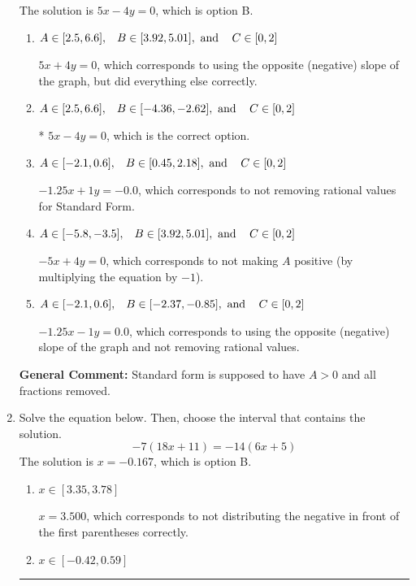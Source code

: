 \documentclass{extbook}[14pt]
\newcommand{\litem}[1]{\item #1

\rule{\textwidth}{0.4pt}}
\begin{document}
\begin{enumerate}
{The solution is \( 5x - 4y = 0 \), which is option B.\begin{enumerate}[label=\Alph*.]
\item \( A \in [2.5, 6.6], \hspace{3mm} B \in [3.92, 5.01], \text{ and } \hspace{3mm} C \in [0, 2] \)

 $5x + 4y = 0$, which corresponds to using the opposite (negative) slope of the graph, but did everything else correctly.
\item \( A \in [2.5, 6.6], \hspace{3mm} B \in [-4.36, -2.62], \text{ and } \hspace{3mm} C \in [0, 2] \)

* $5x - 4y = 0$, which is the correct option.
\item \( A \in [-2.1, 0.6], \hspace{3mm} B \in [0.45, 2.18], \text{ and } \hspace{3mm} C \in [0, 2] \)

 $-1.25x + 1y = -0.0$, which corresponds to not removing rational values for Standard Form.
\item \( A \in [-5.8, -3.5], \hspace{3mm} B \in [3.92, 5.01], \text{ and } \hspace{3mm} C \in [0, 2] \)

 $-5x + 4y = 0$, which corresponds to not making $A$ positive (by multiplying the equation by $-1$).
\item \( A \in [-2.1, 0.6], \hspace{3mm} B \in [-2.37, -0.85], \text{ and } \hspace{3mm} C \in [0, 2] \)

 $-1.25x - 1y = 0.0$, which corresponds to using the opposite (negative) slope of the graph and not removing rational values.
\end{enumerate}

\textbf{General Comment:} Standard form is supposed to have $A > 0$ and all fractions removed.
}
\litem{
Solve the equation below. Then, choose the interval that contains the solution.
\[ -7(18x + 11) = -14(6x + 5) \]The solution is \( x = -0.167 \), which is option B.\begin{enumerate}[label=\Alph*.]
\item \( x \in [3.35, 3.78] \)

$x = 3.500$, which corresponds to not distributing the negative in front of the first parentheses correctly.
\item \( x \in [-0.42, 0.59] \)


\end{enumerate}}
\end{enumerate}
\end{document}
